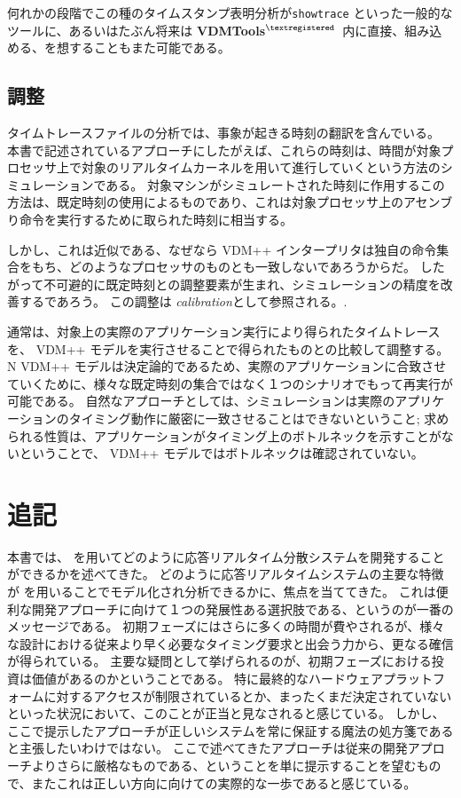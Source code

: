 \documentclass[\pformat,12pt]{jreport}
\newcommand{\vdmtools}{\textbf{VDMTools}$^{\mathbf{{\textregistered}}}$}
\begin{document}
何れかの段階でこの種のタイムスタンプ表明分析が\texttt{showtrace} といった一般的なツールに、あるいはたぶん将来は \vdmtools\ 内に直接、組み込める、を想することもまた可能である。

\section{調整}

タイムトレースファイルの分析では、事象が起きる時刻の翻訳を含んでいる。
本書で記述されているアプローチにしたがえば、これらの時刻は、時間が対象プロセッサ上で対象のリアルタイムカーネルを用いて進行していくという方法のシミュレーションである。
対象マシンがシミュレートされた時刻に作用するこの方法は、既定時刻の使用によるものであり、これは対象プロセッサ上のアセンブり命令を実行するために取られた時刻に相当する。

しかし、これは近似である、なぜなら VDM++ インタープリタは独自の命令集合をもち、どのようなプロセッサのものとも一致しないであろうからだ。
したがって不可避的に既定時刻との調整要素が生まれ、シミュレーションの精度を改善するであろう。
この調整は \emph{calibration}として参照される。.

通常は、対象上の実際のアプリケーション実行により得られたタイムトレースを、 VDM++ モデルを実行させることで得られたものとの比較して調整する。N VDM++ モデルは決定論的であるため、実際のアプリケーションに合致させていくために、様々な既定時刻の集合ではなく１つのシナリオでもって再実行が可能である。
自然なアプローチとしては、シミュレーションは実際のアプリケーションのタイミング動作に厳密に一致させることはできないということ; 求められる性質は、アプリケーションがタイミング上のボトルネックを示すことがないということで、 VDM++ モデルではボトルネックは確認されていない。

\chapter{追記}\label{chap:postscript}

本書では、 \VDMTools を用いてどのように応答リアルタイム分散システムを開発することができるかを述べてきた。
どのように応答リアルタイムシステムの主要な特徴が \VDMTools を用いることでモデル化され分析できるかに、焦点を当ててきた。
これは便利な開発アプローチに向けて１つの発展性ある選択肢である、というのが一番のメッセージである。
初期フェーズにはさらに多くの時間が費やされるが、様々な設計における従来より早く必要なタイミング要求と出会う力から、更なる確信が得られている。
主要な疑問として挙げられるのが、初期フェーズにおける投資は価値があるのかということである。
特に最終的なハードウェアプラットフォームに対するアクセスが制限されているとか、まったくまだ決定されていないといった状況において、このことが正当と見なされると感じている。
しかし、ここで提示したアプローチが正しいシステムを常に保証する魔法の処方箋であると主張したいわけではない。
ここで述べてきたアプローチは従来の開発アプローチよりさらに厳格なものである、ということを単に提示することを望むもので、またこれは正しい方向に向けての実際的な一歩であると感じている。
\end{document}
